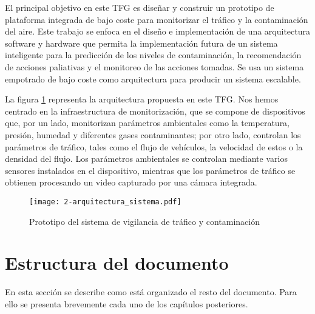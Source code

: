 El principal objetivo en este \ac{TFG} es diseñar y construir un prototipo de plataforma integrada de bajo coste para monitorizar el tráfico y la contaminación del aire. Este trabajo se enfoca en el diseño e implementación de una arquitectura software y hardware que permita la implementación futura de un sistema inteligente para la predicción de los niveles de contaminación, la recomendación de acciones paliativas y el monitoreo de las acciones tomadas. Se usa un sistema empotrado de bajo coste como arquitectura para producir un sistema escalable.

La figura \ref{fig:2-arquitectura_sistema} representa la arquitectura propuesta en este \ac{TFG}. Nos hemos centrado en la infraestructura de monitorización, que se compone de dispositivos que, por un lado, monitorizan parámetros ambientales como la temperatura, presión, humedad y diferentes gases contaminantes; por otro lado, controlan los parámetros de tráfico, tales como el flujo de vehículos, la velocidad de estos o la densidad del flujo. Los parámetros ambientales se controlan mediante varios sensores instalados en el dispositivo, mientras que los parámetros de tráfico se obtienen procesando un video capturado por una cámara integrada.

\begin{figure}[!h]
	\begin{center}
		\texttt{[image: 2-arquitectura\_sistema.pdf]}	
		\caption{Prototipo del sistema de vigilancia de tráfico y contaminación}
		\label{fig:2-arquitectura_sistema}
	\end{center}
\end{figure}


\section{Estructura del documento} 
En esta sección se describe como está organizado el resto del documento. Para ello se presenta brevemente cada uno de los capítulos posteriores.

